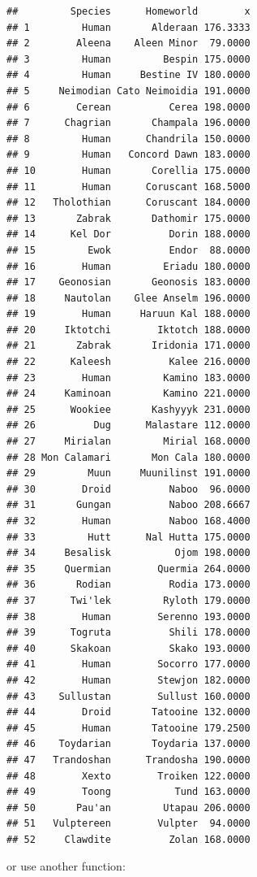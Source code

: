 \documentclass[]{gitbook}
\newenvironment{Shaded}{\begin{snugshade}}{\end{snugshade}}
\newcommand{\DataTypeTok}[1]{\textcolor[rgb]{0.13,0.29,0.53}{#1}}
\newcommand{\KeywordTok}[1]{\textcolor[rgb]{0.13,0.29,0.53}{\textbf{#1}}}
\newcommand{\NormalTok}[1]{#1}
\newcommand{\OperatorTok}[1]{\textcolor[rgb]{0.81,0.36,0.00}{\textbf{#1}}}
\begin{document}
\begin{verbatim}
##         Species      Homeworld        x
## 1         Human       Alderaan 176.3333
## 2        Aleena    Aleen Minor  79.0000
## 3         Human         Bespin 175.0000
## 4         Human     Bestine IV 180.0000
## 5     Neimodian Cato Neimoidia 191.0000
## 6        Cerean          Cerea 198.0000
## 7      Chagrian       Champala 196.0000
## 8         Human      Chandrila 150.0000
## 9         Human   Concord Dawn 183.0000
## 10        Human       Corellia 175.0000
## 11        Human      Coruscant 168.5000
## 12   Tholothian      Coruscant 184.0000
## 13       Zabrak       Dathomir 175.0000
## 14      Kel Dor          Dorin 188.0000
## 15         Ewok          Endor  88.0000
## 16        Human         Eriadu 180.0000
## 17    Geonosian       Geonosis 183.0000
## 18     Nautolan    Glee Anselm 196.0000
## 19        Human     Haruun Kal 188.0000
## 20     Iktotchi        Iktotch 188.0000
## 21       Zabrak       Iridonia 171.0000
## 22      Kaleesh          Kalee 216.0000
## 23        Human         Kamino 183.0000
## 24     Kaminoan         Kamino 221.0000
## 25      Wookiee       Kashyyyk 231.0000
## 26          Dug      Malastare 112.0000
## 27     Mirialan         Mirial 168.0000
## 28 Mon Calamari       Mon Cala 180.0000
## 29         Muun     Muunilinst 191.0000
## 30        Droid          Naboo  96.0000
## 31       Gungan          Naboo 208.6667
## 32        Human          Naboo 168.4000
## 33         Hutt      Nal Hutta 175.0000
## 34     Besalisk           Ojom 198.0000
## 35     Quermian        Quermia 264.0000
## 36       Rodian          Rodia 173.0000
## 37      Twi'lek         Ryloth 179.0000
## 38        Human        Serenno 193.0000
## 39      Togruta          Shili 178.0000
## 40      Skakoan          Skako 193.0000
## 41        Human        Socorro 177.0000
## 42        Human        Stewjon 182.0000
## 43    Sullustan        Sullust 160.0000
## 44        Droid       Tatooine 132.0000
## 45        Human       Tatooine 179.2500
## 46    Toydarian       Toydaria 137.0000
## 47   Trandoshan      Trandosha 190.0000
## 48        Xexto        Troiken 122.0000
## 49        Toong           Tund 163.0000
## 50       Pau'an         Utapau 206.0000
## 51   Vulptereen        Vulpter  94.0000
## 52     Clawdite          Zolan 168.0000
\end{verbatim}

or use another function:

\begin{Shaded}
\end{Shaded}
\end{document}
